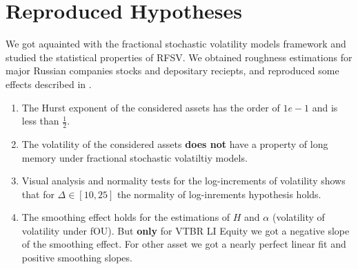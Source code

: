 \section*{Reproduced Hypotheses}
    We got aquainted with the fractional stochastic volatility models framework and
    studied the statistical properties of RFSV. 
    We obtained roughness estimations for major Russian companies stocks and depositary 
    reciepts, and reproduced some effects described in \cite{GatheralRosenbaum2014}.

    \begin{enumerate}
        \item The Hurst exponent of the considered assets has the order of $1e-1$ and is less than $\frac{1}{2}$.
        \item The volatility of the considered assets \textbf{does not} have a property of long memory under fractional stochastic 
                volatiltiy models.
        \item Visual analysis and normality tests for the log-increments of volatility shows that for 
              $\Delta \in [10, 25]$ the normality of log-inrements hypothesis holds.
        \item The smoothing effect holds for the estimations of $H$ and $\alpha$ (volatility of volatility under fOU). 
              But \textbf{only} for  VTBR LI Equity we got a negative slope of the smoothing effect. For other
              asset we got a nearly perfect linear fit and positive smoothing slopes.
    \end{enumerate}